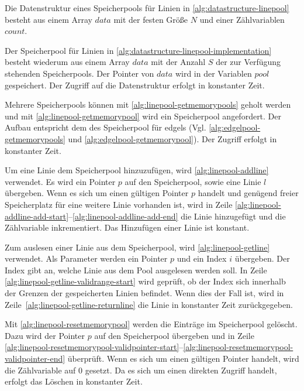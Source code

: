 

Die Datenstruktur eines Speicherpools für Linien in \autoref{alg:datastructure-linepool} besteht aus einem Array
 $\mathit{data}$ mit der festen Größe $N$ und einer Zählvariablen $\mathit{count}$.



Der Speicherpool für Linien in \autoref{alg:datastructure-linepool-implementation} besteht wiederum aus einem Array
 $\mathit{data}$ mit der Anzahl $S$ der zur Verfügung stehenden Speicherpools. Der Pointer von $\mathit{data}$ wird in
 der Variablen $\mathit{pool}$ gespeichert. Der Zugriff auf die Datenstruktur erfolgt in konstanter Zeit.

Mehrere Speicherpools können mit \autoref{alg:linepool-getmemorypools} geholt werden und mit
 \autoref{alg:linepool-getmemorypool} wird ein Speicherpool angefordert. Der Aufbau entspricht dem des Speicherpool für
 \glspl{edgel} (Vgl. \autoref{alg:edgelpool-getmemorypools} und \autoref{alg:edgelpool-getmemorypool}). Der Zugriff
 erfolgt in konstanter Zeit.





Um eine Linie dem Speicherpool hinzuzufügen, wird \autoref{alg:linepool-addline} verwendet. Es wird ein Pointer $p$ auf
 den Speicherpool, sowie eine Linie $l$ übergeben. Wenn es sich um einen gültigen Pointer $p$ handelt und genügend
 freier Speicherplatz für eine weitere Linie vorhanden ist, wird in Zeile
 \ref{alg:linepool-addline-add-start}--\ref{alg:linepool-addline-add-end} die Linie hinzugefügt und die Zählvariable
 inkrementiert. Das Hinzufügen einer Linie ist konstant.



Zum auslesen einer Linie aus dem Speicherpool, wird \autoref{alg:linepool-getline} verwendet. Als Parameter werden ein
 Pointer $p$ und ein Index $i$ übergeben. Der Index gibt an, welche Linie aus dem Pool ausgelesen werden soll. In Zeile
 \ref{alg:linepool-getline-validrange-start} wird geprüft, ob der Index sich innerhalb der Grenzen der gespeicherten
 Linien befindet. Wenn dies der Fall ist, wird in Zeile~\ref{alg:linepool-getline-returnline} die Linie in konstanter
 Zeit zurückgegeben.



Mit \autoref{alg:linepool-resetmemorypool} werden die Einträge im Speicherpool gelöscht. Dazu wird der Pointer $p$ auf
 den Speicherpool übergeben und in Zeile
 \ref{alg:linepool-resetmemorypool-validpointer-start}--\ref{alg:linepool-resetmemorypool-validpointer-end} überprüft.
 Wenn es sich um einen gültigen Pointer handelt, wird die Zählvariable auf $0$ gesetzt. Da es sich um einen direkten
 Zugriff handelt, erfolgt das Löschen in konstanter Zeit.

